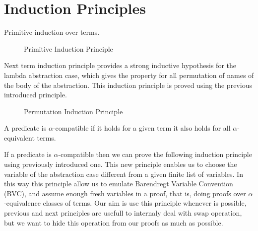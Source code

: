 \documentclass{entcs}
\newcommand{\alp}{\ensuremath{\alpha}}
\begin{document}
 \hspace{5px}

 \hspace{5px}

 \hspace{5px}

 \hspace{5px}

 \hspace{5px}


\section{Induction Principles}
\label{sec:induction}

Primitive induction over  terms.

\begin{figure}[!ht]
  \caption{Primitive Induction Principle}
\label{fig:primInd}
\end{figure}

Next term induction principle provides a strong inductive hypothesis for the lambda abstraction case, which gives the property for all permutation of names of the body of the abstraction. This induction principle is proved using the previous introduced principle.

\begin{figure}[!ht]
  \caption{Permutation Induction Principle}
\label{fig:permInd}
\end{figure}

A predicate is \alp-compatible if it holds for a given term it also holds for all \alp-equivalent terms.

 \hspace{5px}

If a predicate is \alp-compatible then we can prove the following induction principle using previously introduced one. This new principle enables us to choose the variable of the abstraction case different from a given finite list of variables. In this way this principle allow us to emulate Barendregt Variable Convention (BVC), and assume enough fresh variables in a proof, that is, doing proofs over \alp-equivalence classes of terms. Our aim is use this principle whenever is possible, previous and next principles are usefull to internaly deal with swap operation, but we want to hide this operation from our proofs as much as possible.
\end{document}
